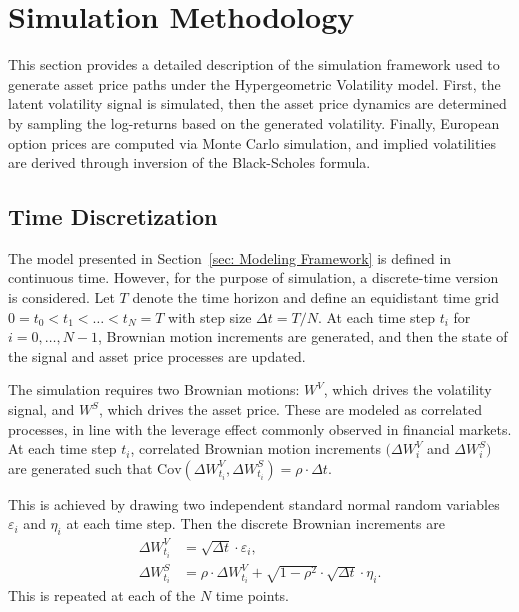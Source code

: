 \section{Simulation Methodology} \label{sec: Simulation Methodology}

This section provides a detailed description of the simulation framework used to generate asset price paths under the Hypergeometric Volatility model. First, the latent volatility signal is simulated, then the asset price dynamics are determined by sampling the log-returns based on the generated volatility. Finally, European option prices are computed via Monte Carlo simulation, and implied volatilities are derived through inversion of the Black-Scholes formula.


\subsection{Time Discretization} \label{subsec: Time Discretization}

The model presented in Section~\ref{sec: Modeling Framework} is defined in continuous time. However, for the purpose of simulation, a discrete-time version is considered. Let $T$ denote the time horizon and define an equidistant time grid $0 = t_0 < t_1 < \ldots < t_N = T$ with step size $\Delta t = T/N$. At each time step $t_i$ for $i = 0,\ldots,N-1$, Brownian motion increments are generated, and then the state of the signal and asset price processes are updated.

The simulation requires two Brownian motions: $W^V$, which drives the volatility signal, and $W^S$, which drives the asset price. These are modeled as correlated processes, in line with the leverage effect commonly observed in financial markets. At each time step $t_i$, correlated Brownian motion increments $(\Delta W_i^V$ and $\Delta W_i^S)$ are generated such that $\mathrm{Cov}(\Delta W_{t_i}^V, \Delta W_{t_i}^S) = \rho \cdot \Delta t$.

This is achieved by drawing two independent standard normal random variables $\varepsilon_i$ and $\eta_i$ at each time step. Then the discrete Brownian increments are
\begin{align} \label{eq:BrownianMotions}
    \Delta W_{t_i}^V &= \sqrt{\Delta t} \cdot \varepsilon_i, \\
    \Delta W_{t_i}^S &= \rho \cdot \Delta W_{t_i}^V + \sqrt{1 - \rho^2} \cdot \sqrt{\Delta t} \cdot \eta_i.
\end{align}
This is repeated at each of the $N$ time points.


